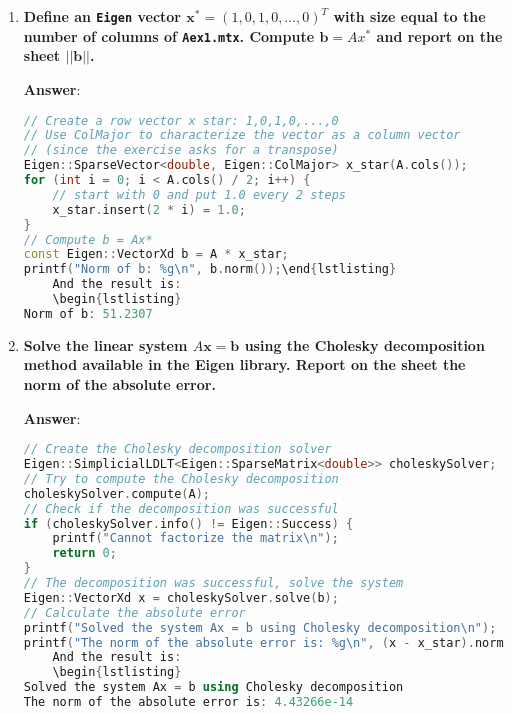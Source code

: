 \begin{enumerate}[label=\textcolor{Green3}{\textbf{\arabic*.}}]
    \item \textcolor{Green3}{\textbf{%
        Define an \texttt{Eigen} vector $\mathbf{x}^{*} = \left(1, 0, 1, 0, \dots, 0\right)^{T}$ with size equal to the number of columns of \texttt{Aex1.mtx}. Compute $\mathbf{b} = Ax^{*}$ and report on the sheet $\left|\left|\mathbf{b}\right|\right|$.
    }}

    \textbf{Answer}:
    \begin{lstlisting}[language=C++]
// Create a row vector x star: 1,0,1,0,...,0
// Use ColMajor to characterize the vector as a column vector
// (since the exercise asks for a transpose)
Eigen::SparseVector<double, Eigen::ColMajor> x_star(A.cols());
for (int i = 0; i < A.cols() / 2; i++) {
    // start with 0 and put 1.0 every 2 steps
    x_star.insert(2 * i) = 1.0;
}
// Compute b = Ax*
const Eigen::VectorXd b = A * x_star;
printf("Norm of b: %g\n", b.norm());\end{lstlisting}
    And the result is:
    \begin{lstlisting}
Norm of b: 51.2307\end{lstlisting}




    \item \textcolor{Green3}{\textbf{%
        Solve the linear system $A\mathbf{x} = \mathbf{b}$ using the Cholesky decomposition method available in the Eigen library. Report on the sheet the norm of the absolute error.
    }}

    \textbf{Answer}:
    \begin{lstlisting}[language=C++]
// Create the Cholesky decomposition solver
Eigen::SimplicialLDLT<Eigen::SparseMatrix<double>> choleskySolver;
// Try to compute the Cholesky decomposition
choleskySolver.compute(A);
// Check if the decomposition was successful
if (choleskySolver.info() != Eigen::Success) {
    printf("Cannot factorize the matrix\n");
    return 0;
}
// The decomposition was successful, solve the system
Eigen::VectorXd x = choleskySolver.solve(b);
// Calculate the absolute error
printf("Solved the system Ax = b using Cholesky decomposition\n");
printf("The norm of the absolute error is: %g\n", (x - x_star).norm());\end{lstlisting}
    And the result is:
    \begin{lstlisting}
Solved the system Ax = b using Cholesky decomposition
The norm of the absolute error is: 4.43266e-14\end{lstlisting}



\end{enumerate}
